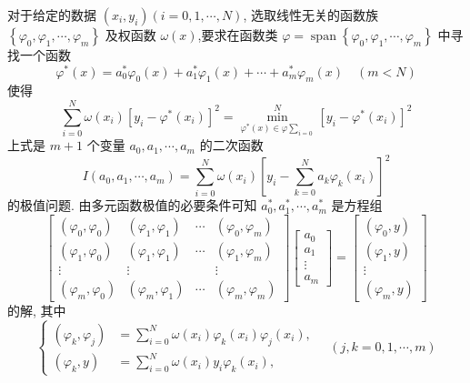 对于给定的数据 $ \left(x_{i}, y_{i}\right)(i=0,1, \cdots, N) $, 选取线性无关的函数族 $ \left\{\varphi_{0}, \varphi_{1}, \cdots, \varphi_{m}\right\} $ 及权函数 $ \omega(x) $,要求在函数类 $ \varphi=\operatorname{span}\left\{\varphi_{0}, \varphi_{1}, \cdots, \varphi_{m}\right\} $ 中寻找一个函数
$$
\varphi^{*}(x)=a_{0}^{*} \varphi_{0}(x)+a_{1}^{*} \varphi_{1}(x)+\cdots+a_{m}^{*} \varphi_{m}(x) \quad(m<N)
$$
使得
$$
\sum_{i=0}^{N} \omega\left(x_{i}\right)\left[y_{i}-\varphi^{*}\left(x_{i}\right)\right]^{2}=\min _{\varphi^{*}(x) \in \varphi\sum_{i=0}}^{N}\left[y_{i}-\varphi^{*}\left(x_{i}\right)\right]^{2}
$$
上式是 $ m+1 $ 个变量 $ a_{0}, a_{1}, \cdots, a_{m} $ 的二次函数
$$
I\left(a_{0}, a_{1}, \cdots, a_{m}\right)=\sum_{i=0}^{N} \omega\left(x_{i}\right)\left[y_{i}-\sum_{k=0}^{N} a_{k} \varphi_{k}\left(x_{i}\right)\right]^{2}
$$
的极值问题. 由多元函数极值的必要条件可知 $ a_{0}^{*}, a_{1}^{*}, \cdots, a_{m}^{*} $ 是方程组
$$
\left[\begin{array}{cccc}
\left(\varphi_{0}, \varphi_{0}\right) & \left(\varphi_{1}, \varphi_{1}\right) & \cdots & \left(\varphi_{0}, \varphi_{m}\right) \\
\left(\varphi_{1}, \varphi_{0}\right) & \left(\varphi_{1}, \varphi_{1}\right) & \cdots & \left(\varphi_{1}, \varphi_{m}\right) \\
\vdots & \vdots & & \vdots \\
\left(\varphi_{m}, \varphi_{0}\right) & \left(\varphi_{m}, \varphi_{1}\right) & \cdots & \left(\varphi_{m}, \varphi_{m}\right)
\end{array}\right]\left[\begin{array}{c}
a_{0} \\
a_{1} \\
\vdots \\
a_{m}
\end{array}\right]=\left[\begin{array}{c}
\left(\varphi_{0}, y\right) \\
\left(\varphi_{1}, y\right) \\
\vdots \\
\left(\varphi_{m}, y\right)
\end{array}\right]
$$
的解, 其中
$$
\left\{\begin{aligned}
\left(\varphi_{k}, \varphi_{j}\right)&=\sum_{i=0}^{N} \omega\left(x_{i}\right) \varphi_{k}\left(x_{i}\right) \varphi_{j}\left(x_{i}\right), \\
\left(\varphi_{k}, y\right)&=\sum_{i=0}^{N} \omega\left(x_{i}\right) y_{i} \varphi_{k}\left(x_{i}\right),
\end{aligned} \quad(j, k=0,1, \cdots, m)\right.
$$
